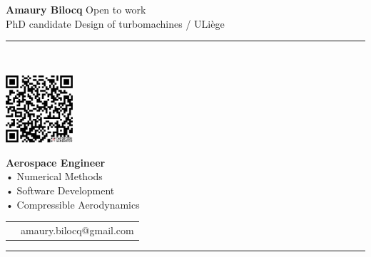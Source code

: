 \documentclass[11pt,a4paper]{memoir}
\begin{document}
\begin{Spacing}{0.75}%
\noindent
\textcolor{myBlue}{\textbf{Amaury Bilocq}} \hfill \tiny{\color{gray}Open to work}\\ 
\noindent
\tiny PhD candidate \hfill {\color{gray}Design of turbomachines / ULiège}\\ 
\textcolor{myBlue}{\rule{74mm}{.3mm}}\\

\begin{minipage}[t]{33mm}
    \vspace{0mm}
    \includegraphics[width=25mm]{cvABilocq.png} %
\end{minipage}
\hspace{-2mm}
\begin{minipage}[t]{42mm}
    \vspace{2mm}
    \begin{flushleft}
        
    {\scriptsize
        \begin{Spacing}{1}%
        \textcolor{myBlue}{\textbf{Aerospace Engineer}}\\
        \hspace{0.5mm}• Numerical Methods\\
        \hspace{0.5mm}• Software Development\\
        \hspace{0.5mm}• Compressible Aerodynamics\vspace{2mm}\\
        \end{Spacing}
    }
    {\tiny
        \begin{tabular}{rl}
            \hspace{-6mm}{\color{gray}email} & amaury.bilocq@gmail.com\\
        \end{tabular}
        \vspace*{2mm}
    }
    \end{flushleft}
\end{minipage}

\rule{74mm}{0mm}
\end{Spacing}
\end{document}
